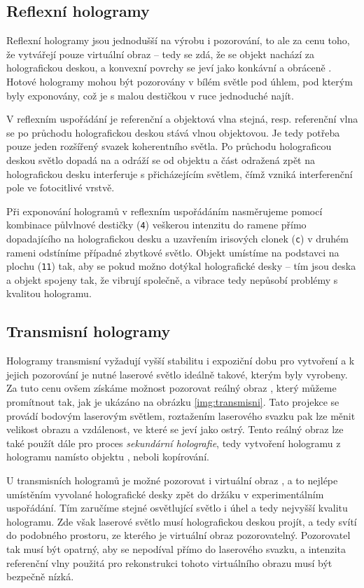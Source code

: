 \documentclass[twoside,project]{../MFFPrace}
\begin{document}
\subsection{Reflexní hologramy}
Reflexní hologramy jsou jednodušší na výrobu i pozorování, to ale za cenu toho, že vytvářejí pouze virtuální obraz -- tedy se zdá, že se objekt nachází za holografickou deskou, a konvexní povrchy se jeví jako konkávní a obráceně \cite{holography}. Hotové hologramy mohou být pozorovány v bílém světle pod úhlem, pod kterým byly exponovány, což je s malou destičkou v ruce jednoduché najít.

\medskip

V reflexním uspořádání je referenční a objektová vlna stejná, resp. referenční vlna se po průchodu holografickou deskou stává vlnou objektovou. Je tedy potřeba pouze jeden rozšířený svazek koherentního světla. Po průchodu holograficou deskou světlo dopadá na a odráží se od objektu a část odražená zpět na holografickou desku interferuje s přicházejícím světlem, čímž vzniká interferenční pole ve fotocitlivé vrstvě.

\medskip

Při exponování hologramů v reflexním uspořádáním nasměrujeme pomocí kombinace půlvlnové destičky (\texttt{4}) veškerou intenzitu do ramene přímo dopadajícího na holografickou desku a uzavřením irisových clonek (\texttt{c}) v druhém rameni odstíníme případné zbytkové světlo. Objekt umístíme na podstavci na plochu (\texttt{11}) tak, aby se pokud možno dotýkal holografické desky -- tím jsou deska a objekt spojeny tak, že vibrují společně, a vibrace tedy nepůsobí problémy s kvalitou hologramu.

\subsection{Transmisní hologramy}
Hologramy transmisní vyžadují vyšší stabilitu i expoziční dobu pro vytvoření a k jejich pozorování je nutné laserové světlo ideálně takové, kterým byly vyrobeny. Za tuto cenu ovšem získáme možnost pozorovat reálný obraz \cite{holography}, který můžeme promítnout tak, jak je ukázáno na obrázku \ref{img:transmisni}. Tato projekce se provádí bodovým laserovým světlem, roztažením laserového svazku pak lze měnit velikost obrazu a vzdálenost, ve které se jeví jako ostrý. Tento reálný obraz lze také použít dále pro proces \textit{sekundární holografie}, tedy vytvoření hologramu z hologramu namísto objektu \cite{holography}, neboli kopírování.

U transmisních hologramů je možné pozorovat i virtuální obraz \cite{holography}, a to nejlépe umístěním vyvolané holografické desky zpět do držáku v experimentálním uspořádání. Tím zaručíme stejné osvětlující světlo i úhel a tedy nejvyšší kvalitu hologramu. Zde však laserové světlo musí holografickou deskou projít, a tedy svítí do podobného prostoru, ze kterého je virtuální obraz pozorovatelný. Pozorovatel tak musí být opatrný, aby se nepodíval přímo do laserového svazku, a intenzita referenční vlny použitá pro rekonstrukci tohoto virtuálního obrazu musí být bezpečně nízká.
\end{document}

